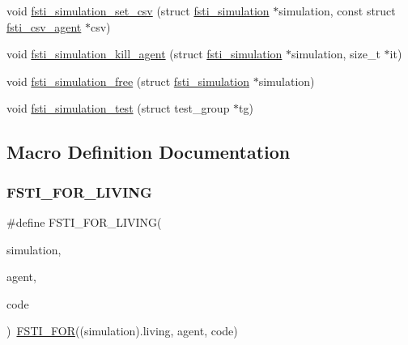 \begin{DoxyCompactItemize}
\item 
void \mbox{\hyperlink{fsti-simulation_8h_acfe68dac880c7a6112ac0d13bfc34cce}{fsti\+\_\+simulation\+\_\+set\+\_\+csv}} (struct \mbox{\hyperlink{structfsti__simulation}{fsti\+\_\+simulation}} $\ast$simulation, const struct \mbox{\hyperlink{structfsti__csv__agent}{fsti\+\_\+csv\+\_\+agent}} $\ast$csv)
\item 
void \mbox{\hyperlink{fsti-simulation_8h_a9d76145c517a59cb16affaf38f6da235}{fsti\+\_\+simulation\+\_\+kill\+\_\+agent}} (struct \mbox{\hyperlink{structfsti__simulation}{fsti\+\_\+simulation}} $\ast$simulation, size\+\_\+t $\ast$it)
\item 
void \mbox{\hyperlink{fsti-simulation_8h_ae29f6c96793ab175ff8021f853c0b898}{fsti\+\_\+simulation\+\_\+free}} (struct \mbox{\hyperlink{structfsti__simulation}{fsti\+\_\+simulation}} $\ast$simulation)
\item 
void \mbox{\hyperlink{fsti-simulation_8h_a86e77278da10e20688210e211787e7d2}{fsti\+\_\+simulation\+\_\+test}} (struct test\+\_\+group $\ast$tg)
\end{DoxyCompactItemize}


\subsection{Macro Definition Documentation}
\mbox{\label{fsti-simulation_8h_ab09972db973bc8382592ffc0d0c9b1ec}} 
\subsubsection{\texorpdfstring{F\+S\+T\+I\+\_\+\+F\+O\+R\+\_\+\+L\+I\+V\+I\+NG}{FSTI\_FOR\_LIVING}}
{\footnotesize\ttfamily \#define F\+S\+T\+I\+\_\+\+F\+O\+R\+\_\+\+L\+I\+V\+I\+NG(\begin{DoxyParamCaption}\item[{}]{simulation,  }\item[{}]{agent,  }\item[{}]{code }\end{DoxyParamCaption})~\mbox{\hyperlink{fsti-agent_8h_a4c03aa904df401cdd442c95af046e217}{F\+S\+T\+I\+\_\+\+F\+OR}}((simulation).living, agent, code)}



